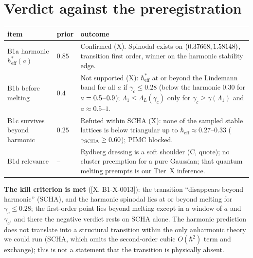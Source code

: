 \documentclass[10pt]{article}
\newcommand{\tier}[1]{\textsf{[#1]}}
\newcommand{\hb}{\hbar_{\mathrm{eff}}}
\begin{document}
\section{Verdict against the preregistration}\label{sec:verdict}
\begin{center}\small\begin{tabular}{p{}p{}p{}}\toprule item & prior & outcome\\\midrule
B1a harmonic $\hb^*(a)$ & $0.85$ & Confirmed (X). Spinodal exists on $(0.37668,1.58148)$, transition first order, winner on the harmonic stability edge.\\
B1b before melting & $0.4$ & Not supported (X): $\hb^*$ at or beyond the Lindemann band for all $a$ if $\gamma_c\le0.28$ (below the harmonic $0.30$ for $a=0.5$--$0.9$); $\Lambda_1\le\Lambda_L(\gamma_c)$ only for $\gamma_c\ge\gamma(\Lambda_1)$ and $a\approx0.5$--$1$.\\
B1c survives beyond harmonic & $0.25$ & Refuted within SCHA (X): none of the sampled stable lattices is below triangular up to $\hb\approx0.27$--$0.33$ ($\gamma_{\rm SCHA}\ge0.60$); PIMC blocked.\\
B1d relevance & -- & Rydberg dressing is a soft shoulder (C, quote); no cluster preemption for a pure Gaussian; that quantum melting preempts is our Tier~X inference.\\\bottomrule\end{tabular}\end{center}
\textbf{The kill criterion is met} (\tier{X, B1-X-0013}): the transition ``disappears beyond harmonic'' (SCHA), and the harmonic spinodal lies at or beyond melting for $\gamma_c\le0.28$; the first-order point lies beyond melting except in a window of $a$ and $\gamma_c$, and there the negative verdict rests on SCHA alone. The harmonic prediction does not translate into a structural transition within the only anharmonic theory we could run (SCHA, which omits the second-order cubic $O(\hbar^2)$ term and exchange); this is not a statement that the transition is physically absent.

\end{document}
